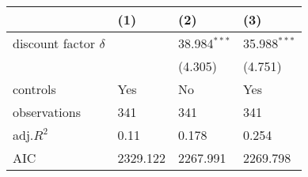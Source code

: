 \begin{tabular}{llll}
\hline
 & (1) & (2) & (3) \\
\hline
discount factor $\delta$ &  & 38.984$^{***}$ & 35.988$^{***}$ \\
 &  & (4.305) & (4.751) \\
controls & Yes & No & Yes \\
observations & 341 & 341 & 341 \\
adj.$R^2$ & 0.11 & 0.178 & 0.254 \\
AIC & 2329.122 & 2267.991 & 2269.798 \\
\hline
\end{tabular}
